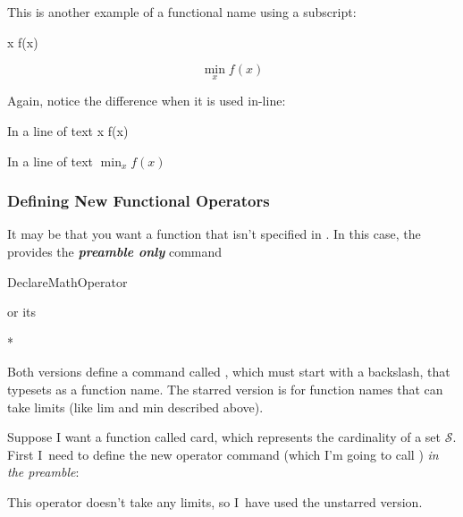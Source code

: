 
This is another example of a functional name using a subscript:
\begin{codeS}
 x f(x) 
\end{codeS}%
\begin{resultS}
\[
\min_x f(x)
\]
\end{resultS}%
Again, notice the difference when it is used in-line:
\begin{codeS}
In a line of text x 
f(x)
\end{codeS}%
\begin{resultS}
In a line of text $\min_x f(x)$
\end{resultS}
\bookpagebreak

\subsubsection{Defining New Functional Operators}
\label{sec:declaremathop}

It may be that you want a function that isn't specified in
. In this case, the  provides the
\textbf{\em \gls{preamble} only} command
\begin{definition}
\gls{DeclareMathOperator}
\end{definition}
or its 
\begin{definition}
*
\end{definition}
%
Both versions define a command called , which must start
with a backslash, that typesets  as a function
name.  The starred version is for function names that can take
limits (like \gls{lim} and \gls{min} described above).


Suppose I want a function called card, which represents the
cardinality of a set $\mathcal{S}$. First I~need to define the new
operator command (which I'm going to call ) \emph{in
the \gls{preamble}}:
\begin{codeS}
\end{codeS}
This operator doesn't take any limits, so I~have used the unstarred
version.

